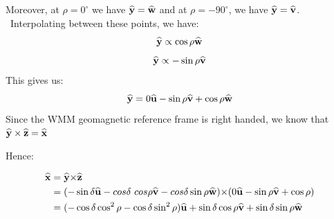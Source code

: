 \documentclass{article}
\newcommand{\tmstrong}[1]{\textbf{#1}}
\begin{document}
Moreover, at $\rho = 0^{\circ}$ we have $\widehat{\text{{\tmstrong{y}}}} =
\text{$\widehat{\text{{\tmstrong{w}}}}$}$ and at $\rho = - 90^{\circ}$, we
have $\widehat{\text{{\tmstrong{y}}}} =
\text{$\widehat{\text{{\tmstrong{v}}}}$}$. \ Interpolating between these
points, we have:
\begin{equation}
  \widehat{\text{{\tmstrong{y}}}} \propto \cos \rho
  \text{$\widehat{\text{{\tmstrong{w}}}}$} \label{eq6}
\end{equation}
\begin{equation}
  \widehat{\text{{\tmstrong{y}}}} \propto - \sin \rho
  \text{$\widehat{\text{{\tmstrong{v}}}}$} \label{eq7}
\end{equation}
This gives us:
\begin{equation}
  \widehat{\text{{\tmstrong{y}}}} = 0 \text{$\widehat{\text{{\tmstrong{u}}}}$}
  - \sin \rho \text{$\widehat{\text{{\tmstrong{v}}}}$} + \cos \rho
  \text{$\widehat{\text{{\tmstrong{w}}}}$} \label{eqy}
\end{equation}
Since the WMM geomagnetic reference frame is right handed, we know that
$\widehat{\text{{\tmstrong{y}}}} \times \widehat{\text{{\tmstrong{z}}}} =
\widehat{\text{{\tmstrong{x}}}}$

Hence:

\begin{align*}
  \widehat{\text{{\tmstrong{x}}}} &
  =\widehat{\text{{\tmstrong{y}}}}{\times}\widehat{\text{{\tmstrong{z}}}}\\
  & =(-\sin {\delta} \text{$\widehat{\text{{\tmstrong{u}}}}$}- cos {\delta} \
  cos {\rho} \text{$\widehat{\text{{\tmstrong{v}}}}$}- cos {\delta} \sin
  {\rho} \text{$\widehat{\text{{\tmstrong{w}}}}$}){\times}(0
  \text{$\widehat{\text{{\tmstrong{u}}}}$}-\sin {\rho}
  \text{$\widehat{\text{{\tmstrong{v}}}}$}+ \cos {\rho})\\
  & =(-\cos {\delta} \cos^2{\rho} -\cos {\delta} \sin^2{\rho}
  )\text{$\widehat{\text{{\tmstrong{u}}}}$}+\sin {\delta} \cos {\rho}
  \text{$\widehat{\text{{\tmstrong{v}}}}$}+\sin {\delta} \sin {\rho}
  \text{$\widehat{\text{{\tmstrong{w}}}}$}
\end{align*}
\end{document}
